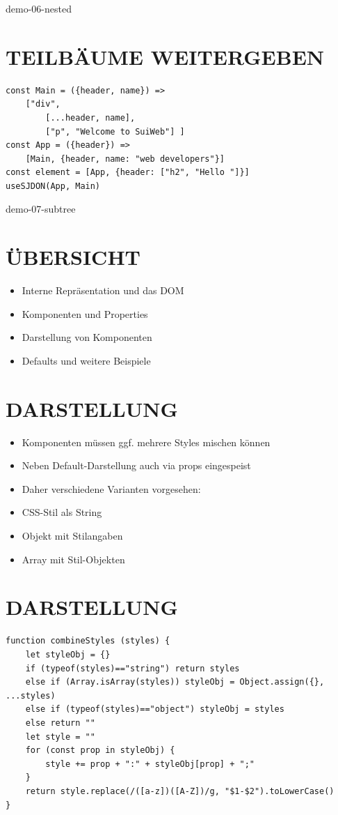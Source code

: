 \documentclass[10pt]{article}
\begin{document}
demo-06-nested

\section*{TEILBÄUME WEITERGEBEN}
\begin{verbatim}
const Main = ({header, name}) =>
    ["div",
        [...header, name],
        ["p", "Welcome to SuiWeb"] ]
const App = ({header}) =>
    [Main, {header, name: "web developers"}]
const element = [App, {header: ["h2", "Hello "]}]
useSJDON(App, Main)
\end{verbatim}

demo-07-subtree

\section*{ÜBERSICHT}
\begin{itemize}
  \item Interne Repräsentation und das DOM
  \item Komponenten und Properties
  \item Darstellung von Komponenten
  \item Defaults und weitere Beispiele
\end{itemize}

\section*{DARSTELLUNG}
\begin{itemize}
  \item Komponenten müssen ggf. mehrere Styles mischen können
  \item Neben Default-Darstellung auch via props eingespeist
  \item Daher verschiedene Varianten vorgesehen:
  \item CSS-Stil als String
  \item Objekt mit Stilangaben
  \item Array mit Stil-Objekten
\end{itemize}

\section*{DARSTELLUNG}
\begin{verbatim}
function combineStyles (styles) {
    let styleObj = {}
    if (typeof(styles)=="string") return styles
    else if (Array.isArray(styles)) styleObj = Object.assign({}, ...styles)
    else if (typeof(styles)=="object") styleObj = styles
    else return ""
    let style = ""
    for (const prop in styleObj) {
        style += prop + ":" + styleObj[prop] + ";"
    }
    return style.replace(/([a-z])([A-Z])/g, "$1-$2").toLowerCase()
}
\end{verbatim}
\end{document}
